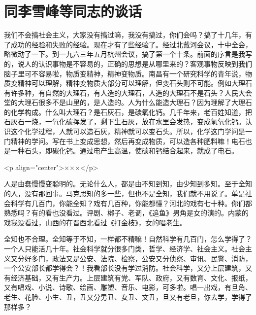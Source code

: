 \section[同李雪峰等同志的谈话（一九六四年八月二十日）]{同李雪峰等同志的谈话}


我们不会搞社会主义，大家没有搞过嘛，我没有搞过，你们会吗？搞了十几年，有了成功的经验和失败的经验。现在才有了些经验了。经过北戴河会议，十中全会，略微动了一下。到一九六三年五月杭州会议，搞了第一个十条。前面的序言是我写的，说人的认识事物是不容易的，正确的思想是从哪里来的？客观事物反映到我们脑子里可不容易啦，物质变精神，精神变物质。南昌有一个研究科学的青年说，物质变精神可以理解，精神变物质大部分可以理解，但变石头则不可能。例如大理石有许多种，有自然的大理石，有人造的大理石，人造的大理石不是石头？人民大会堂的大理石很多不是山里的，是人造的。人为什么能造大理石？因为理解了大理石的化学构成。什么叫大理石？是石灰石，是碳氧化钙。几千年来，老百姓知道，把石灰石一烧，一氧化碳挥发了，剩下生石灰，放在水里会发热，变成氢氧化钙。认识这个化学过程，人就可以造石灰，精神就可以变石头。所以，化学这门学问是一门精神的学问。写在书上变成思想，然后再变成物质，可以造各种肥料嘛！电石也是一种石头，即碳化钙。通过电产生高温，使碳和钙结合起来，就成了电石。

<p align="center">×××</p>

人是由蠢慢慢变聪明的。无论什么人，都是由不知到知，由少知到多知。至于全知的人，没有那回事。马克思知的多一些，但也不是全知，我们就不用说了。单是社会科学有几百门，你能全知？戏有几百种，你能都懂？河北的戏有七十种。你们都熟悉吗？有的看也没看过。评剧、梆子、老调，《追鱼》男角是女的演的。内蒙的戏我没看过，山西的在晋西北看过《打金枝》，女的唱老生。

全知也不合理。全知等于不知，一样都不精嘛！自然科学有几百门，怎么学得了？一个人只能活几十年。社会科学就分很多门类，哲学、经济学、社会主义。社会主义又分好多门，政法又是公安、法院、检察，公安又分侦察、审讯、民警、消防，一个公安部长都学得会？！我看部长没有学过消防。社会科学，又分上层建筑，又有经济基础，又有生产力。上层建筑有党、军队、政府，又有数育、文化、报纸，又有唱戏、小说、诗歌、绘画、雕塑、音乐、电影，可多啦。唱一出戏，有旦角、老生、花脸、小生、丑，丑又分男丑、女丑、文丑，旦又有老旦，你去学，学得了那样多？


